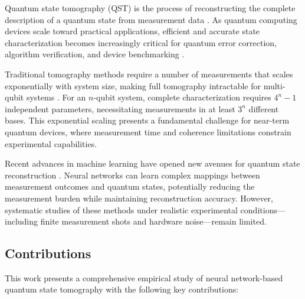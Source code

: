 \documentclass[conference]{IEEEtran}
\begin{document}
Quantum state tomography (QST) is the process of reconstructing the complete description of a quantum state from measurement data \cite{paris2004quantum}. As quantum computing devices scale toward practical applications, efficient and accurate state characterization becomes increasingly critical for quantum error correction, algorithm verification, and device benchmarking \cite{cramer2010efficient}.

Traditional tomography methods require a number of measurements that scales exponentially with system size, making full tomography intractable for multi-qubit systems \cite{gross2010quantum}. For an $n$-qubit system, complete characterization requires $4^n - 1$ independent parameters, necessitating measurements in at least $3^n$ different bases. This exponential scaling presents a fundamental challenge for near-term quantum devices, where measurement time and coherence limitations constrain experimental capabilities.

Recent advances in machine learning have opened new avenues for quantum state reconstruction \cite{carleo2019machine, torlai2018neural}. Neural networks can learn complex mappings between measurement outcomes and quantum states, potentially reducing the measurement burden while maintaining reconstruction accuracy. However, systematic studies of these methods under realistic experimental conditions—including finite measurement shots and hardware noise—remain limited.

\subsection{Contributions}

This work presents a comprehensive empirical study of neural network-based quantum state tomography with the following key contributions:
\end{document}
